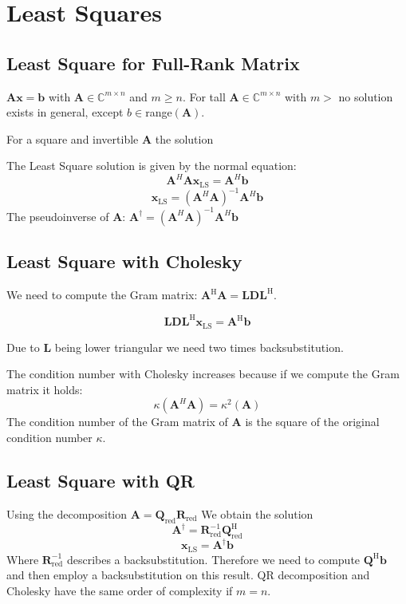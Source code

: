 \documentclass[english]{latex4ei/latex4ei_sheet}
\begin{document}
\section{Least Squares}
\begin{sectionbox}
\subsection{Least Square for Full-Rank Matrix}
$\mathbf{A}\mathbf{x} = \mathbf{b}$ with $\mathbf{A}\in\mathbb{C}^{m\times n}$ and $m\geq n$.  
For tall $\mathbf{A}\in\mathbb{C}^{m\times n}$ with $m>$ no solution exists in general, except $b\in$range$(\mathbf{A})$.

For a square and invertible $\mathbf{A}$ the solution

The Least Square solution is given by the normal equation:
$$\mathbf{A}^H\mathbf{A}\mathbf{x}_{\text{LS}} = \mathbf{A}^H\mathbf{b}$$
$$\mathbf{x}_{\text{LS}} = (\mathbf{A}^H\mathbf{A})^{-1}\mathbf{A}^H\mathbf{b}$$
The pseudoinverse of $\mathbf{A}$: \quad $\mathbf{A}^\dagger = (\mathbf{A}^H\mathbf{A})^{-1}\mathbf{A}^H\mathbf{b}$

\subsection{Least Square with Cholesky}
We need to compute the Gram matrix: $\mathbf{A}^\text{H}\mathbf{A} = \mathbf{L}\mathbf{D}\mathbf{L}^\text{H}$.

$$\mathbf{L}\mathbf{D}\mathbf{L}^\text{H} \mathbf{x}_{\text{LS}} = \mathbf{A}^\text{H}\mathbf{b}$$

Due to $\mathbf{L}$ being lower triangular we need two times backsubstitution.

The condition number with Cholesky increases because if we compute the Gram matrix it holds:
$$\kappa (\mathbf{A}^H\mathbf{A}) = \kappa^2 (\mathbf{A})$$
The condition number of the Gram matrix of $\mathbf{A}$ is the square of the original condition number $\kappa$.

\end{sectionbox}
\begin{sectionbox}
\subsection{Least Square with QR}
Using the decomposition $\mathbf{A} = \mathbf{Q}_{\text{red}}\mathbf{R}_{\text{red}}$
We obtain the solution
$$\mathbf{A}^\dagger = \mathbf{R}^{-1}_{\text{red}}\mathbf{Q}^\text{H}_{\text{red}}$$
$$\mathbf{x}_{\text{LS}}=\mathbf{A}^\dagger \mathbf{b}$$
Where $\mathbf{R}^{-1}_{\text{red}}$ describes a backsubstitution.
Therefore we need to compute $\mathbf{Q}^\text{H}\mathbf{b}$ and then employ a backsubstitution on this result.
QR decomposition and Cholesky have the same order of complexity if $m=n$.
\end{sectionbox}
\end{document}
